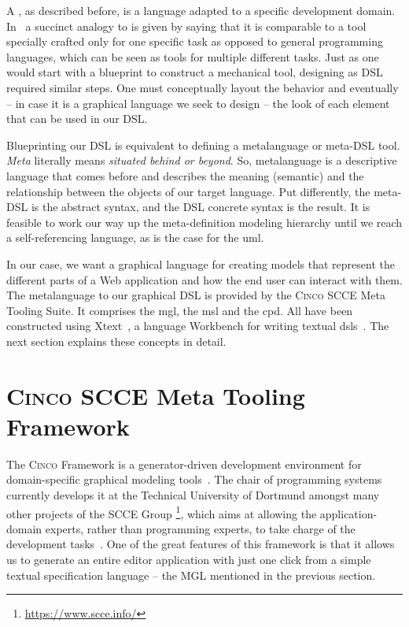 A , as described before, is a language adapted to a specific development domain. In~\cite{Naujokat2018} a succinct analogy to  is given by saying that it is comparable to a tool specially crafted only for one specific task as opposed to general programming languages, which can be seen as tools for multiple different tasks. Just as one would start with a blueprint to construct a mechanical tool, designing as DSL required similar steps. One must conceptually layout the behavior and eventually -- in case it is a graphical language we seek to design -- the look of each element that can be used in our DSL.

Blueprinting our DSL is equivalent to defining a metalanguage or meta-DSL tool. \textit{Meta} literally means \textit{situated behind or beyond}\cite{merriam}. So, metalanguage is a descriptive language that comes before and describes the meaning (semantic) and the relationship between the objects of our target language. Put differently, the meta-DSL is the abstract syntax, and the DSL concrete syntax is the result. It is feasible to work our way up the meta-definition modeling hierarchy until we reach a self-referencing language, as is the case for the \gls{uml}.

In our case, we want a graphical language for creating models that represent the different parts of a Web application and how the end user can interact with them. The metalanguage to our graphical DSL is provided by the \textsc{Cinco} SCCE Meta Tooling Suite. It comprises the \gls{mgl}, the \gls{msl} and the \gls{cpd}. All have been constructed using Xtext~\cite{bettini2016implementing}, a language Workbench for writing textual \glspl*{dsl}~\cite{naujokat-diss}. The next section explains these concepts in detail.

\section{\textsc{Cinco SCCE} Meta Tooling Framework}\label{sec:cincoFW}


The \textsc{Cinco} Framework is a generator-driven development environment for domain-specific graphical modeling tools~\cite{Cinco}. The chair of programming systems currently develops it at the Technical University of Dortmund amongst many other projects of the SCCE Group \footnote[1]{\url{https://www.scce.info/}}, which aims at allowing the application-domain experts, rather than programming experts, to take charge of the development tasks~\cite{scce}. One of the great features of this framework is that it allows us to generate an entire editor application with just one click from a simple textual specification language -- the MGL mentioned in the previous section. 

